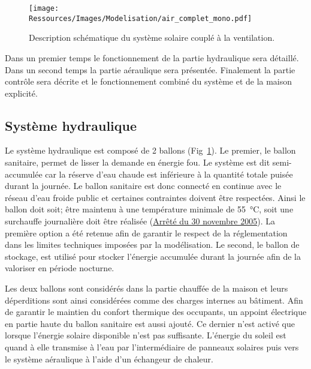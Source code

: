 \begin{figure}
    \begin{center}
        \texttt{[image: Ressources/Images/Modelisation/air\_complet\_mono.pdf]}
    \end{center}
    \caption{Description schématique du système solaire couplé à la ventilation.
             \label{fig:air_complet_mono}}
\end{figure}

Dans un premier temps le fonctionnement de la partie hydraulique sera détaillé. Dans un
second temps la partie aéraulique sera présentée. Finalement la partie contrôle sera
décrite et le fonctionnement combiné du système et de la maison explicité.

\subsection{Système hydraulique} %
\label{sub:systeme_hydraulique}
Le système hydraulique est composé de 2 ballons (Fig~\ref{fig:air_complet_mono}). Le
premier, le ballon sanitaire, permet de lisser la demande en énergie fou. Le système est
dit semi-accumulée car la réserve d’eau chaude est inférieure à la quantité totale puisée
durant la journée. Le ballon sanitaire est donc connecté en continue avec le réseau d’eau
froide public et certaines contraintes doivent être respectées. Ainsi le ballon doit soit;
être maintenu à une température minimale de \SI{55}{\celsius}, soit une surchauffe
journalière doit être réalisée
(\href{https://www.legifrance.gouv.fr/affichTexte.do?cidTexte=JORFTEXT000000423756}{Arrêté
du 30 novembre 2005}). La première option a été retenue afin de garantir le respect de la
réglementation dans les limites techniques imposées par la modélisation. Le second, le
ballon de stockage, est utilisé pour stocker l’énergie accumulée durant la journée afin de
la valoriser en période nocturne.

Les deux ballons sont considérés dans la partie chauffée de la maison et leurs
déperditions sont ainsi considérées comme des charges internes au bâtiment. Afin de
garantir le maintien du confort thermique des occupants, un appoint électrique en partie
haute du ballon sanitaire est aussi ajouté. Ce dernier n’est activé que lorsque l’énergie
solaire disponible n’est pas suffisante. L’énergie du soleil est quand à elle transmise à
l’eau par l’intermédiaire de panneaux solaires puis vers le système aéraulique à l’aide
d’un échangeur de chaleur.

